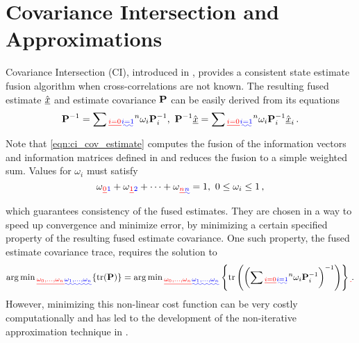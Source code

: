 \documentclass[letterpaper, 10 pt, conference]{ieeeconf}  %
\providecommand{\DIFadd}[1]{{\protect\color{blue}\uwave{#1}}} %
\providecommand{\DIFdel}[1]{{\protect\color{red}\sout{#1}}}                      %
\providecommand{\DIFaddbegin}{} %
\providecommand{\DIFaddend}{} %
\providecommand{\DIFdelbegin}{} %
\providecommand{\DIFdelend}{} %
\begin{document}
\section{Covariance Intersection and Approximations} \label{sec:ci}
Covariance Intersection (CI), introduced in \cite{julierNondivergentEstimationAlgorithm1997}, provides a consistent state estimate fusion algorithm when cross-correlations are not known. The resulting fused estimate $\hat{{\underline{x}}}$ and estimate covariance ${{\mathbf{P}}}$ can be easily derived from its equations
\begin{equation}
   \mP^{-1}=\sum\DIFdelbegin \DIFdel{_{i=0}}\DIFdelend \DIFaddbegin \DIFadd{_{i=1}}\DIFaddend ^{n}\omega_i \mP_i^{-1},\ \mP^{-1} \mean{\vec{x}} =\sum\DIFdelbegin \DIFdel{_{i=0}}\DIFdelend \DIFaddbegin \DIFadd{_{i=1}}\DIFaddend ^{n}\omega_i \mP_i^{-1} \mean{\vec{x}}_i\,. \label{eqn:ci_cov_estimate}
\end{equation}
Note that \eqref{eqn:ci_cov_estimate} computes the fusion of the information vectors and information matrices defined in \cite{niehsenInformationFusionBased2002} and reduces the fusion to a simple weighted sum.
Values for $\omega_i$ must satisfy
\begin{equation}
   \omega\DIFdelbegin \DIFdel{_0 }\DIFdelend \DIFaddbegin \DIFadd{_1 }\DIFaddend + \omega\DIFdelbegin \DIFdel{_1 }\DIFdelend \DIFaddbegin \DIFadd{_2 }\DIFaddend + \cdots + \omega\DIFdelbegin \DIFdel{_n }\DIFdelend \DIFaddbegin \DIFadd{_{n} }\DIFaddend = 1,\ 0 \leq \omega_i \leq 1\,, \label{eqn:ci_omega_sum_bound}
\end{equation}
which guarantees consistency of the fused estimates. They are chosen in a way to speed up convergence and minimize error, by minimizing a certain specified property of the resulting fused estimate covariance. One such property, the fused estimate covariance trace, requires the solution to
\begin{equation}
   \argmin\DIFdelbegin \DIFdel{_{\omega_0,\dots,\omega_n} }\DIFdelend \DIFaddbegin \DIFadd{_{\omega_1,\dots,\omega_{n}} }\DIFaddend \{\tr(\mP)\} = \argmin\DIFdelbegin \DIFdel{_{\omega_0,\dots,\omega_n} }\DIFdelend \DIFaddbegin \DIFadd{_{\omega_1,\dots,\omega_{n}} }\DIFaddend \left\{\tr\left(\left(\sum\DIFdelbegin \DIFdel{_{i=0}}\DIFdelend \DIFaddbegin \DIFadd{_{i=1}}\DIFaddend ^{n}\omega_i \mP_i^{-1}\right)^{-1}\right)\right\}\DIFdelbegin \DIFdel{\,}\DIFdelend . \label{eqn:ci_trace_min}
\end{equation}
However, minimizing this non-linear cost function can be very costly computationally and has led to the development of the non-iterative approximation technique in \cite{niehsenInformationFusionBased2002}.
\end{document}
